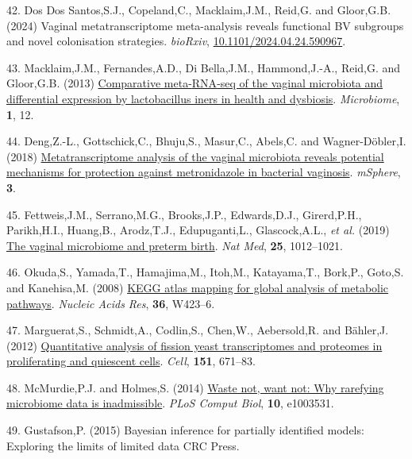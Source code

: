 \documentclass[
]{article}
\newlength{\cslhangindent}
\newenvironment{CSLReferences}[2] %
 {\begin{list}{}{%
  \setlength{\itemindent}{0pt}
  \setlength{\leftmargin}{0pt}
  \setlength{\parsep}{0pt}
  \ifodd #1
   \setlength{\leftmargin}{\cslhangindent}
   \setlength{\itemindent}{-1\cslhangindent}
  \fi
  \setlength{\itemsep}{#2\baselineskip}}}
 {\end{list}}
\begin{document}
\begin{CSLReferences}{1}{1}
42. Dos Dos Santos,S.J., Copeland,C., Macklaim,J.M., Reid,G. and
Gloor,G.B. (2024) Vaginal metatranscriptome meta-analysis reveals
functional BV subgroups and novel colonisation strategies.
\emph{bioRxiv},
\href{https://doi.org/10.1101/2024.04.24.590967}{10.1101/2024.04.24.590967}.

43. Macklaim,J.M., Fernandes,A.D., Di Bella,J.M., Hammond,J.-A., Reid,G.
and Gloor,G.B. (2013)
\href{https://doi.org/10.1186/2049-2618-1-12}{Comparative meta-{RNA}-seq
of the vaginal microbiota and differential expression by lactobacillus
iners in health and dysbiosis}. \emph{Microbiome}, \textbf{1}, 12.

44. Deng,Z.-L., Gottschick,C., Bhuju,S., Masur,C., Abels,C. and
Wagner-Döbler,I. (2018)
\href{https://doi.org/10.1128/mSphereDirect.00262-18}{Metatranscriptome
analysis of the vaginal microbiota reveals potential mechanisms for
protection against metronidazole in bacterial vaginosis}.
\emph{mSphere}, \textbf{3}.

45. Fettweis,J.M., Serrano,M.G., Brooks,J.P., Edwards,D.J., Girerd,P.H.,
Parikh,H.I., Huang,B., Arodz,T.J., Edupuganti,L., Glascock,A.L.,
\emph{et al.} (2019)
\href{https://doi.org/10.1038/s41591-019-0450-2}{The vaginal microbiome
and preterm birth}. \emph{Nat Med}, \textbf{25}, 1012--1021.

46. Okuda,S., Yamada,T., Hamajima,M., Itoh,M., Katayama,T., Bork,P.,
Goto,S. and Kanehisa,M. (2008)
\href{https://doi.org/10.1093/nar/gkn282}{KEGG atlas mapping for global
analysis of metabolic pathways}. \emph{Nucleic Acids Res}, \textbf{36},
W423--6.

47. Marguerat,S., Schmidt,A., Codlin,S., Chen,W., Aebersold,R. and
Bähler,J. (2012)
\href{https://doi.org/10.1016/j.cell.2012.09.019}{Quantitative analysis
of fission yeast transcriptomes and proteomes in proliferating and
quiescent cells}. \emph{Cell}, \textbf{151}, 671--83.

48. McMurdie,P.J. and Holmes,S. (2014)
\href{https://doi.org/10.1371/journal.pcbi.1003531}{Waste not, want not:
Why rarefying microbiome data is inadmissible}. \emph{PLoS Comput Biol},
\textbf{10}, e1003531.

49. Gustafson,P. (2015) Bayesian inference for partially identified
models: Exploring the limits of limited data CRC Press.


\end{CSLReferences}
\end{document}
